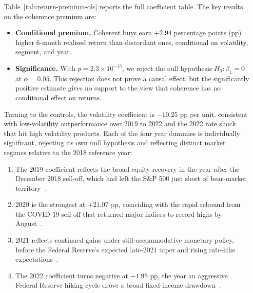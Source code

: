 Table~\ref{tab:return-premium-ols} reports the full coefficient table. The key results on the coherence premium are:
\begin{itemize}
    \item \textbf{Conditional premium.} Coherent buys earn $+2.94$ percentage points (pp) higher 6-month realised return than discordant ones, conditional on volatility, segment, and year.
    \item \textbf{Significance.} With $p = 2.3 \times 10^{-13}$, we reject the null hypothesis $H_0\colon \beta_1 = 0$ at $\alpha = 0.05$. This rejection does not prove a causal effect, but the significantly positive estimate gives no support to the view that coherence has no conditional effect on returns.
\end{itemize}

Turning to the controls, the volatility coefficient is $-10.25$ pp per unit, consistent with low-volatility outperformance over 2019 to 2022 and the 2022 rate shock that hit high volatility products. Each of the four year dummies is individually significant, rejecting its own null hypothesis and reflecting distinct market regimes relative to the 2018 reference year:

\begin{enumerate}
    \item The 2019 coefficient reflects the broad equity recovery in the year after the December 2018 sell-off, which had left the S\&P 500 just short of bear-market territory~\cite{cnbc2019stockmarket}.
    \item 2020 is the strongest at $+21.07$ pp, coinciding with the rapid rebound from the COVID-19 sell-off that returned major indices to record highs by August~\cite{reuters2020sp500recovery}.
    \item 2021 reflects continued gains under still-accommodative monetary policy, before the Federal Reserve's expected late-2021 taper and rising rate-hike expectations~\cite{reuters2021fedtaper}.
    \item The 2022 coefficient turns negative at $-1.95$ pp, the year an aggressive Federal Reserve hiking cycle drove a broad fixed-income drawdown~\cite{reuters2022marketwrap}.
\end{enumerate}

